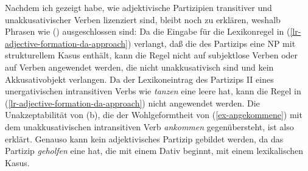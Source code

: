 {Nachdem ich gezeigt habe, wie adjektivische Partizipien transitiver
und unakkusativischer Verben lizenziert sind, bleibt noch zu erklären,
weshalb Phrasen wie () ausgeschlossen sind:
Da die Eingabe für die Lexikonregel in (\ref{lr-adjective-formation-da-approach})
verlangt, daß die \subcatl des Partizips eine NP mit strukturellem Kasus
enthält, kann die Regel nicht auf subjektlose Verben oder auf Verben angewendet
werden, die nicht unakkusativisch sind und kein Akkusativobjekt verlangen.
\eal
{}
\zl
Da der Lexikoneintrag des Partizips II eines unergativischen intransitiven Verbs
wie \emph{tanzen} eine leere \subcatl hat, kann die Regel in (\ref{lr-adjective-formation-da-approach}) nicht angewendet
werden. Die Unakzeptabilität von (b), die der Wohlgeformtheit von (\ref{ex-angekommene}) mit dem unakkusativischen
intransitiven Verb \emph{ankommen} gegenübersteht, ist also erklärt.
Genauso kann kein adjektivisches Partizip  gebildet werden, da das Partizip \emph{geholfen}
eine \subcatl hat, die mit einem Dativ beginnt, \dash mit einem lexikalischen Kasus.



}

